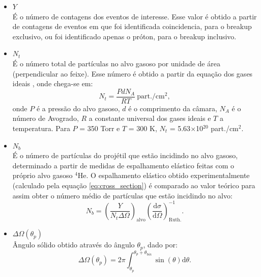 \documentclass[a4paper,12pt,oneside]{book}
\begin{document}
\begin{itemize}
	\item $Y$ \hfill \\
    	É o número de contagens dos eventos de interesse. Esse valor é obtido a partir de contagens de eventos em que foi identificada coincidencia, para o breakup exclusivo, ou foi identificado apenas o próton, para o breakup inclusivo.
	\item $N_t$ \hfill \\
		É o número total de partículas no alvo gasoso por unidade de área (perpendicular ao feixe). Esse número é obtido a partir da equação dos gases ideais \cite{termo_mario}, onde chega-se em:
		\begin{equation}
			N_t = \frac{PdN_A}{RT} \: \mathrm{part./cm^2},
		\end{equation}
		onde $P$ é a pressão do alvo gasoso, $d$ é o comprimento da câmara, $N_A$ é o número de Avogrado, $R$ a constante universal dos gases ideais e $T$ a temperatura. Para $P$ = 350 Torr e $T$ = 300 K, $N_t$ = 5.63$\times$10$^{20}$ part./cm$^2$.
	\item $N_b$ \hfill \\
		É o número de partículas do projétil que estão incidindo no alvo gasoso, determinado a partir de medidas de espalhamento elástico feitas com o próprio alvo gasoso $^4$He. O espalhamento elástico obtido experimentalmente (calculado pela equação \ref{eq:cross_section}) é comparado ao valor teórico para assim obter o número médio de partículas que estão incidindo no alvo:
		\begin{equation}
			N_b = \left( \frac{Y}{N_t \Delta\Omega}\right)_{\mathrm{alvo}} \left(\frac{\mathrm{d}\sigma}{\mathrm{d}\Omega}\right)^{-1}_{\mathrm{Ruth.}}.
		\end{equation}		 
	\item $\Delta\Omega(\theta_p)$  \hfill \\
	Ângulo sólido obtido através do ângulo $\theta_p$, dado por:
	\begin{equation}
	\Delta\Omega (\theta_p) = 2\pi \int_{\theta_p}^{\theta_p + \theta_{bin}}\sin(\theta)\mathrm{d}\theta.		
	\end{equation}
\end{itemize}
\end{document}
